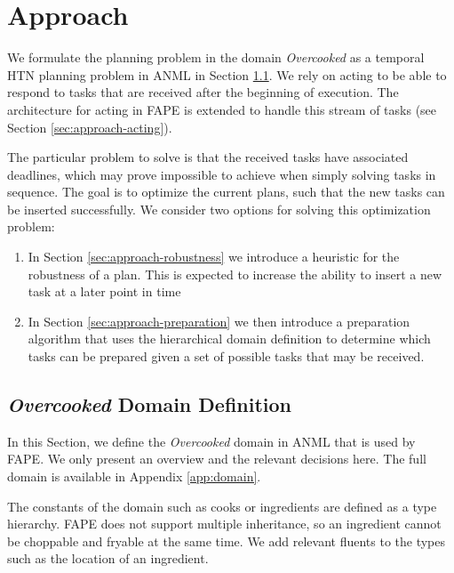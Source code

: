 \section{Approach}\label{sec:approach}


We formulate the planning problem in the domain \textit{Overcooked} as a temporal HTN planning problem in \ac{ANML} in Section \ref{sec:approach-domain}.
We rely on acting to be able to respond to tasks that are received after the beginning of execution.
The architecture for acting in \ac{FAPE} \cite{bit-monnotTemporalHierarchicalModels2016a} is extended to handle this stream of tasks (see Section \ref{sec:approach-acting}).

The particular problem to solve is that the received tasks have associated deadlines, which may prove impossible to achieve when simply solving tasks in sequence.
The goal is to optimize the current plans, such that the new tasks can be inserted successfully.
We consider two options for solving this optimization problem:

\begin{enumerate}
    \item In Section \ref{sec:approach-robustness} we introduce a heuristic for the robustness of a plan. 
    This is expected to increase the ability to insert a new task at a later point in time
    \item In Section \ref{sec:approach-preparation} we then introduce a preparation algorithm that uses the hierarchical domain definition to determine which tasks can be prepared given a set of possible tasks that may be received.
\end{enumerate}

\subsection{\textit{Overcooked} Domain Definition}
\label{sec:approach-domain}

In this Section, we define the \textit{Overcooked} domain in \ac{ANML} \cite{smithANMLLanguage2008} that is used by FAPE.
We only present an overview and the relevant decisions here.
The full domain is available in Appendix \ref{app:domain}.

The constants of the domain such as cooks or ingredients are defined as a type hierarchy.
\ac{FAPE} does not support multiple inheritance, so an ingredient cannot be choppable and fryable at the same time.
We add relevant fluents to the types such as the location of an ingredient.


